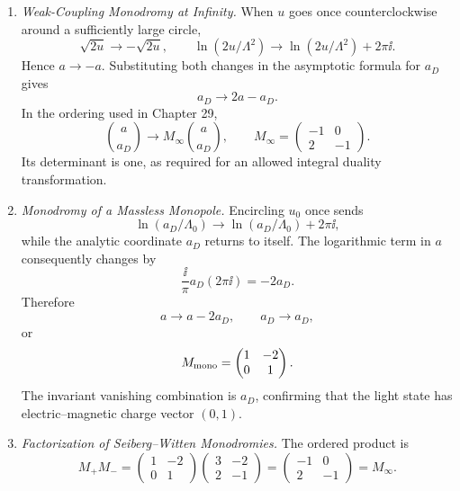 \begin{enumerate}
  \begin{enumerate}
    \item \emph{Weak-Coupling Monodromy at Infinity.}
    When \(u\) goes once counterclockwise around a sufficiently large
      circle,
      \[
        \sqrt{2u}\longrightarrow-\sqrt{2u},\qquad
        \ln(2u/\Lambda^2)\longrightarrow
          \ln(2u/\Lambda^2)+2\pi \ii.
      \]
      Hence \(a\to-a\).  Substituting both changes in the asymptotic formula
      for \(a_D\) gives
      \[
        a_D\longrightarrow 2a-a_D.
      \]
      In the ordering used in Chapter 29,
      \[
        \binom a{a_D}\longrightarrow
        M_\infty\binom a{a_D},
        \qquad
        M_\infty=
          \begin{pmatrix}-1&0\\2&-1\end{pmatrix}.
      \]
      Its determinant is one, as required for an allowed integral duality
      transformation.
    \item \emph{Monodromy of a Massless Monopole.}
    Encircling \(u_0\) once sends
      \[
        \ln(a_D/\Lambda_0)\longrightarrow
          \ln(a_D/\Lambda_0)+2\pi \ii,
      \]
      while the analytic coordinate \(a_D\) returns to itself.  The
      logarithmic term in \(a\) consequently changes by
      \[
        \frac{\ii}{\pi}a_D(2\pi \ii)=-2a_D.
      \]
      Therefore
      \[
        a\longrightarrow a-2a_D,\qquad a_D\longrightarrow a_D,
      \]
      or
      \[
        M_{\rm mono}=
          \begin{pmatrix}1&-2\\0&1\end{pmatrix}.
      \]
      The invariant vanishing combination is \(a_D\), confirming that the
      light state has electric--magnetic charge vector \((0,1)\).
    \item \emph{Factorization of Seiberg--Witten Monodromies.}
    The ordered product is
      \[
        M_+M_-=
        \begin{pmatrix}1&-2\\0&1\end{pmatrix}
        \begin{pmatrix}3&-2\\2&-1\end{pmatrix}
        =
        \begin{pmatrix}-1&0\\2&-1\end{pmatrix}
        =M_\infty.
      \]

\end{enumerate}
\end{enumerate}
